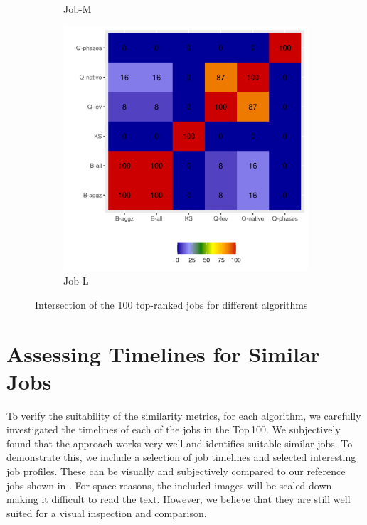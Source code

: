 \documentclass{jhps}
\begin{document}
\begin{figure}[t]
\begin{subfigure}{0.31\textwidth}
\caption{Job-M}\label{fig:heatmap-job-M} %
\end{subfigure}
\begin{subfigure}{0.31\textwidth}
\centering
\includegraphics[width=\textwidth]{job_similarities_7488914-out/intersection-heatmap}
\caption{Job-L}\label{fig:heatmap-job-L}
\end{subfigure}

\centering
\caption{Intersection of the 100 top-ranked jobs for different algorithms}%
\label{fig:heatmap-job}
\end{figure}


\section{Assessing Timelines for Similar Jobs}%
\label{sec:timelines}
To verify the suitability of the similarity metrics, for each algorithm, we carefully investigated the timelines of each of the jobs in the Top\,100.
We subjectively found that the approach works very well and identifies suitable similar jobs.
To demonstrate this, we include a selection of job timelines  and selected interesting job profiles.
These can be visually and subjectively compared to our reference jobs shown in .
For space reasons, the included images will be scaled down making it difficult to read the text.
However, we believe that they are still well suited for a visual inspection and comparison.
\end{document}
